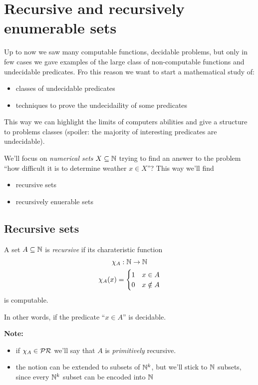 \chapter{Recursive and recursively enumerable sets}
Up to now we saw many computable functions, decidable problems, but
only in few cases we gave examples of the large class of
non-computable functions and undecidable predicates. Fro this reason
we want to start a mathematical study of:
\begin{itemize}
\item classes of undecidable predicates
\item techniques to prove the undecidaility of some predicates
\end{itemize}
This way we can highlight the limits of computers abilities and give a
structure to problems classes (spoiler: the majority of interesting
predicates are undecidable).

We'll focus on \emph{numerical sets} $X \subseteq \mathbb{N}$ trying to find
an answer to the problem ``how difficult it is to determine weather
$x \in X$''? This way we'll find
\begin{itemize}
\item recursive sets
\item recursively enuerable sets
\end{itemize}

\section{Recursive sets}
\begin{definition}
  A set $A \subseteq \mathbb{N}$ is \emph{recursive} if its charateristic
  function
  \begin{gather*}
    \chi_A : \mathbb{N} \rightarrow \mathbb{N} \\
    \chi_A(x) = \begin{cases}
      1 & x\in A \\
      0 & x \notin A
    \end{cases}
  \end{gather*}
  is computable.
\end{definition}

In other words, if the predicate ``$x \in A$'' is decidable.

\textbf{Note:}
\begin{itemize}
\item if $\chi_A \in \mathcal{PR}$ we'll say that $A$ is \emph{primitively}
  recursive.
\item the notion can be extended to subsets of $\mathbb{N}^k$, but we'll
  stick to $\mathbb{N}$ subsets, since every $\mathbb{N}^k$ subset can be encoded
  into $\mathbb{N}$
\end{itemize}

